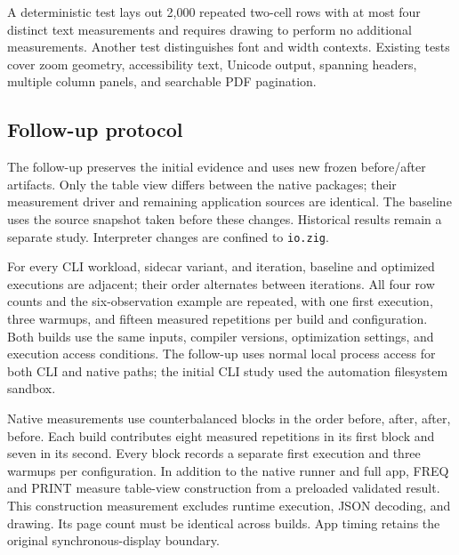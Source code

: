 \documentclass[11pt,a4paper]{article}
\begin{document}
\noindent\begin{minipage}{\linewidth}

\end{minipage}

\noindent\begin{minipage}{\linewidth}

\end{minipage}

A deterministic test lays out 2,000 repeated two-cell rows with
at most four distinct text measurements and requires drawing
to perform no additional measurements. Another test distinguishes
font and width contexts. Existing tests cover zoom geometry,
accessibility text, Unicode output, spanning headers, multiple
column panels, and searchable PDF pagination.

\subsection{Follow-up protocol}

The follow-up preserves the initial evidence and uses new frozen
before/after artifacts. Only the table view differs between
the native packages; their measurement driver and remaining
application sources are identical. The baseline uses the source
snapshot taken before these changes. Historical results remain
a separate study. Interpreter changes are confined to \texttt{io.zig}.

For every CLI workload, sidecar variant, and iteration, baseline
and optimized executions are adjacent; their order alternates
between iterations. All four row counts and the six-observation
example are repeated, with one first execution, three warmups,
and fifteen measured repetitions per build and configuration.
Both builds use the same inputs, compiler versions, optimization
settings, and execution access conditions.
The follow-up uses normal local process access for both CLI and
native paths; the initial CLI study used the automation filesystem sandbox.

Native measurements use counterbalanced blocks in the order
before, after, after, before. Each build contributes eight measured
repetitions in its first block and seven in its second. Every
block records a separate first execution and three warmups per
configuration. In addition to the native runner and full app,
FREQ and PRINT measure table-view construction from a preloaded
validated result. This construction measurement excludes runtime
execution, JSON decoding, and drawing. Its page count must be
identical across builds. App timing retains the original
synchronous-display boundary.
\end{document}
